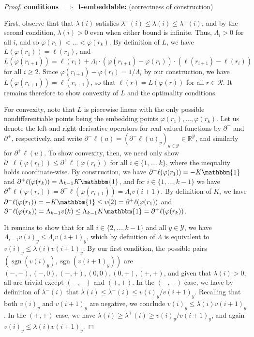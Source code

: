 \documentclass[anon]{colt2020} %
\newcommand{\reals}{\mathbb{R}}
\newcommand{\R}{\mathcal{R}}
\newcommand{\Y}{\mathcal{Y}}
\newcommand{\ones}{\mathbbm{1}}
\DeclareMathOperator*{\sgn}{sgn}
\begin{document}
\begin{proof}
  
  \noindent\textbf{conditions $\implies$ 1-embeddable:} (correctness of construction)

  First, observe that that $\lambda(i)$ satisfies $\lambda^+(i) \leq \lambda(i) \leq \lambda^-(i)$, and by the second condition, $\lambda(i) > 0$ even when either bound is infinite.
  Thus, $\Lambda_i > 0$ for all $i$, and so $\varphi(r_1) < \ldots < \varphi(r_k)$.
  By definition of $L$, we have $L(\varphi(r_1)) = \ell(r_1)$, and $L(\varphi(r_{i+1})) = \ell(r_i) + \Lambda_i \cdot (\varphi(r_{i+1})-\varphi(r_i)) \cdot (\ell(r_{i+1}) - \ell(r_i))$ for all $i \geq 2$.
  Since $\varphi(r_{i+1})-\varphi(r_i) = 1/\Lambda_i$ by our construction, we have $L(\varphi(r_{i+1})) = \ell(r_{i+1})$, so that $\ell(r) = L(\varphi(r))$ for all $r\in\R$.
  It remains therefore to show convexity of $L$ and the optimality conditions.

  For convexity, note that $L$ is piecewise linear with the only possible nondifferentiable points being the embedding points $\varphi(r_1),\ldots,\varphi(r_k)$.
  Let us denote the left and right derivative operators for real-valued functions by $\partial^-$ and $\partial^+$, respectively, and write $\partial^- \ell(u) = (\partial^- \ell(u)_y)_{y\in\Y} \in \reals^\Y$, and similarly for $\partial^+\ell(u)$.
  To show convexity, then, we need only show $\partial^-\ell(\varphi(r_i)) \leq \partial^+\ell(\varphi(r_i))$ for all $i\in\{1,\ldots,k\}$, where the inequality holds coordinate-wise.
  By construction, we have $\partial^-\ell(\varphi(r_1)) = -K\ones$ and $\partial^+\ell(\varphi(r_k)) = \Lambda_{k-1} K\ones$, and for $i\in\{1,\ldots,k-1\}$ we have $\partial^+\ell(\varphi(r_i)) = \partial^-\ell(\varphi(r_{i+1})) = \Lambda_i v(i+1)$.
  By definition of $K$, we have $\partial^-\ell(\varphi(r_1)) = -K \ones \leq v(2) = \partial^+\ell(\varphi(r_1))$ and $\partial^-\ell(\varphi(r_k)) = \Lambda_{k-1} v(k) \leq \Lambda_{k-1} K \ones = \partial^+\ell(\varphi(r_k))$.

  It remains to show that for all $i\in\{2,\ldots,k-1\}$ and all $y\in\Y$, we have $\Lambda_{i-1} v(i)_y \leq \Lambda_i v(i+1)_y$, which by definition of $\Lambda$ is equivalent to $v(i)_y \leq \lambda(i) v(i+1)_y$.
  By our first condition, the possible pairs $(\sgn(v(i)_y),\sgn(v(i+1)_y))$ are $(-,-),(-,0),(-,+),(0,0),(0,+),(+,+)$, and given that $\lambda(i)>0$, all are trivial except $(-,-)$ and $(+,+)$.
  In the $(-,-)$ case, we have by definition of $\lambda^-(i)$ that $\lambda(i) \leq \lambda^-(i) \leq v(i)_y/v(i+1)_y$.
  Recalling that both $v(i)_y$ and $v(i+1)_y$ are negative, we conclude $v(i)_y \leq \lambda(i)v(i+1)_y$.
  In the $(+,+)$ case, we have $\lambda(i) \geq \lambda^+(i) \geq v(i)_y/v(i+1)_y$, and again $v(i)_y \leq \lambda(i)v(i+1)_y$.


\end{proof}
\end{document}
